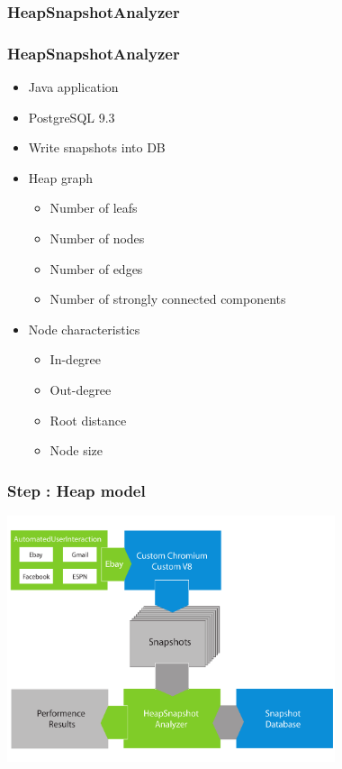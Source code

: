 \subsubsection{HeapSnapshotAnalyzer}
\begin{frame}
	\frametitle{HeapSnapshotAnalyzer}
	\begin{itemize}
		\item Java application
		\item PostgreSQL 9.3
		\item Write snapshots into DB
			
		\pause
			
		\item Heap graph
		\begin{itemize}
			 \item Number of leafs
			 \item Number of nodes
			 \item Number of edges
			 \item Number of strongly connected components
		\end{itemize}
			
		\pause 
			
		\item Node characteristics
		\begin{itemize} 
			 \item In-degree
			 \item Out-degree
			 \item Root distance
			 \item Node size 
		\end{itemize}
	\end{itemize} 
\end{frame}
	
\begin{frame}
	\frametitle{Step \theStepCounter: Heap model}		
	\includegraphics[width=26em]{../imgs/solution_h.pdf}
\end{frame}
	
